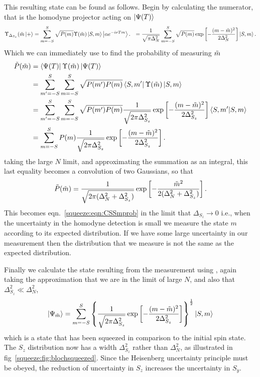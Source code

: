 This resulting state can be found as follows. Begin by calculating the
numerator, that is the homodyne projector acting on $\ket{\Psi(T)}$
%
\begin{align}
  \Upsilon_{\Delta_{S_z}}(\tilde{m}\ket{+} &=
  \sum_{m=-S}^{S}\sqrt{P(m)}\Upsilon(\tilde{m})\ket{S,m}\ket{\alpha e^{-i\nu Tm}}.
  &=\frac{1}{\sqrt{\pi\Delta_N^2}}\sum_{m=-S}^S \sqrt{P(m)} \exp\left[
    -\frac{(m-\tilde{m})^2}{2\Delta_N^2}\right]\ket{S,m}.
\end{align}
%
Which we can immediately use to find the probability of measuring $\tilde{m}$
%
\begin{align}
  \tilde{P}(\tilde{m}) &= \bra{\Psi(T)}\Upsilon(\tilde{m})\ket{\Psi(T)}\\
  & = \sum_{m'=-S}^S \sum_{m=-S}^S \sqrt{P(m')P(m)}\bra{S,
  m'}\Upsilon(\tilde{m})\ket{S, m} \\
  & = \sum_{m'=-S}^S \sum_{m=-S}^S \sqrt{P(m')P(m)}
  \frac{1}{\sqrt{2\pi\Delta_{S_z}^2}}\exp\left[-\frac{(m-\tilde{m})^2}{2\Delta_{S_z}^2}\right] 
  \bra{S, m'}\ket{S, m} \\
  &= \sum_{m=-S}^{S} P(m) 
  \frac{1}{\sqrt{2\pi\Delta_{S_z}^2}}\exp\left[-\frac{(m-\tilde{m})^2}{2\Delta_{S_z}^2}\right] .
\end{align}
%
taking the large $N$ limit, and approximating the summation as an integral,
this last equality becomes a convolution of two Gaussians, so that
%
\begin{equation}
  \tilde{P}(\tilde{m}) = \frac{1}{\sqrt{2\pi(\Delta_N^2 + \Delta_{S_z}^2)}}\exp\left[
    -\frac{\tilde{m}^2}{2(\Delta_N^2 + \Delta_{S_z}^2)}\right].
\end{equation}
%
This becomes eqn.~\ref{squeeze:eqn:CSSmprob} in the limit that $\Delta_{S_z} \to 0$
i.e., when the uncertainty in the homodyne detection is small we measure the
state $m$ according to its expected distribution. If we have some large
uncertainty in our measurement then the distribution that we measure is not the
same as the expected distribution.

Finally we calculate the state resulting from the measurement using
, again taking the
approximation that we are in the limit of large $N$, and also that
$\Delta_{S_z}^2 \ll \Delta_N^2$,
%
\begin{equation}
  \ket{\Psi_{\tilde{m}}} =
  \sum_{m=-S}^S\left\{\frac{1}{\sqrt{2\pi\Delta_{S_z}^2}} \exp\left[-\frac{(m -
  \tilde{m})^2}{2\Delta_{S_z}^2}\right]\right\}^\frac{1}{2} \ket{S,m}
\end{equation}
%
which is a state that has been squeezed in comparison to the initial spin
state. The $S_z$ distribution now has a width $\Delta_{S_z}^2$ rather than
$\Delta_N^2$, as illustrated in fig~\ref{squeeze:fig:blochsqueezed}. Since the
Heisenberg uncertainty principle must be obeyed, the reduction of uncertainty
in $S_z$ increases the uncertainty in $S_y$.

